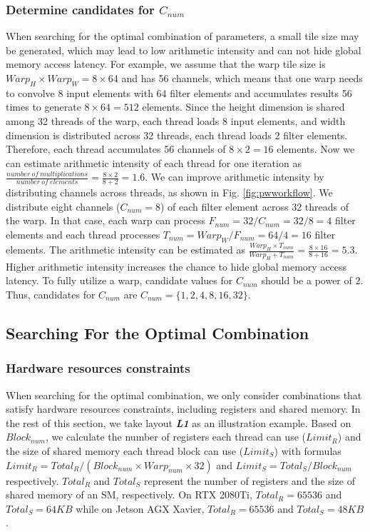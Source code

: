 \subsubsection{Determine candidates for $C_{num}$}
When searching for the optimal combination of parameters, a small tile size may be generated, which may lead to low arithmetic intensity and can not hide global memory access latency.
 For example, we assume that the warp tile size is $Warp_H \times Warp_W = 8 \times 64$ and has 56 channels, which means that one warp needs to convolve 8 input elements with 64 filter elements and accumulates results 56 times to generate $8 \times 64=512$ elements. Since the height dimension is shared among 32 threads of the warp, each thread loads 8 input elements, and width dimension is distributed across 32 threads, each thread loads 2 filter elements. Therefore, each thread accumulates 56 channels of $8 \times 2=16$ elements. Now we can estimate arithmetic intensity of each thread for one iteration as $\frac{number\ of\ multiplications}{number\ of\ elements}=\frac{8 \times 2}{8 + 2}=1.6$. We can improve arithmetic intensity by distributing channels across threads, as shown in Fig. \ref{fig:pwworkflow}. We distribute eight channels ($C_{num}=8$) of each filter element across 32 threads of the warp. 
 In that case, each warp can process $F_{num}=32/C_{num}=32/8=4$ filter elements and each thread processes $T_{num}=Warp_W/F_{num}=64/4=16$ filter elements.
 The arithmetic intensity can be estimated as $\frac{Warp_H \times T_{num}}{Warp_H + T_{num}}=\frac{8 \times 16}{8+16}=5.3$.
 Higher arithmetic intensity increases the chance to hide global memory access latency.
To fully utilize a warp, candidate values for $C_{num}$ should be a power of 2.
Thus, candidates for $C_{num}$ are $C_{num}=\{1,2,4,8,16,32\}$.


\subsection{Searching For the Optimal Combination}
\subsubsection{Hardware resources constraints}
When searching for the optimal combination, we only consider combinations that satisfy hardware resources constraints, including registers and shared memory.
In the rest of this section, we take layout \textbf{\emph{L1}} as an illustration example.
Based on $Block_{num}$, we calculate the number of registers each thread can use ($Limit_R$) and the size of shared memory each thread block can use ($Limit_S$) with formulas $Limit_R=Total_R/(Block_{num}\times Warp_{num} \times 32)$ and $Limit_S=Total_S/Block_{num}$ respectively. $Total_R$ and $Total_S$ represent the number of registers and the size of shared memory of an SM, respectively. On RTX 2080Ti, $Total_R=65536$ and $Total_S=64KB$ while  on Jetson AGX Xavier, $Total_R=65536$ and $Total_S=48KB$.

